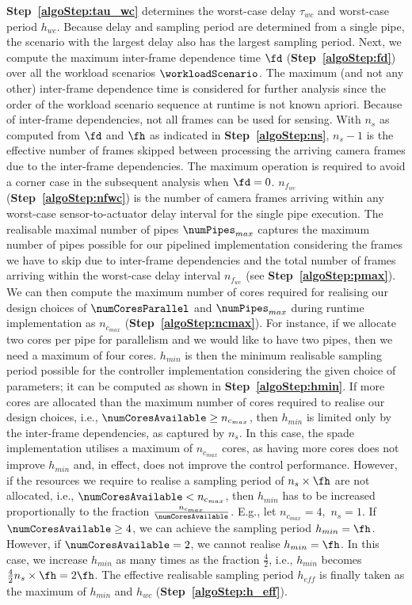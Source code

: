 \textbf{Step~\ref{algoStep:tau_wc}} determines the worst-case delay $\tau_{wc}$ and worst-case period $h_{wc}$. 
Because delay and sampling period are determined from a single pipe, the scenario with the largest delay also has the largest sampling period.
Next, we compute the maximum inter-frame dependence time $\fd$ ({\bfseries Step~\ref{algoStep:fd}}) over all the workload scenarios $\workloadScenario$. 
The maximum (and not any other) inter-frame dependence time is considered for further analysis since the order of the workload scenario sequence at runtime is not known apriori. Because of inter-frame dependencies, not all frames can be used for sensing.
With $n_s$ as computed from $\fd$ and $\fh$ as indicated in \textbf{Step~\ref{algoStep:ns}}, $n_s-1$ is the effective number of frames skipped between processing the arriving camera frames due to the inter-frame dependencies. 
The maximum operation is required to avoid a corner case in the subsequent analysis when $\fd =0$. 
$n_{f_{wc}}$ ({\bfseries Step~\ref{algoStep:nfwc}}) is the number of camera frames arriving within any worst-case sensor-to-actuator delay interval for the single pipe execution.
The realisable maximal number of pipes $\numPipes_{max}$ captures the maximum number of pipes possible for our pipelined implementation considering the frames we have to skip due to inter-frame dependencies and the total number of frames arriving within the worst-case delay interval $n_{f_{wc}}$ (see {\bfseries Step~\ref{algoStep:pmax}}).
We can then compute the maximum number of cores required for realising our design choices of $\numCoresParallel$ and $\numPipes_{max}$ during runtime implementation as $n_{c_{max}}$ ({\bfseries Step~\ref{algoStep:ncmax}}). For instance, if we allocate two cores per pipe for parallelism and we would like to have two pipes, then we need a maximum of four cores.
$h_{min}$ is then the minimum realisable sampling period possible for the controller implementation considering the given choice of parameters; it can be computed as shown in {\bfseries Step~\ref{algoStep:hmin}}.
If more cores are allocated than the maximum number of cores required to realise our design choices, i.e., $\numCoresAvailable\ge n_{c_{max}}$, then $h_{min}$ is limited only by the inter-frame dependencies, as captured by $n_s$.
In this case, the \gls{spade} implementation utilises a maximum of $n_{c_{max}}$ cores, as having more cores does not improve $h_{min}$ and, in effect, does not improve the control performance. 
However, if the resources we require to realise a sampling period of $n_s\times \fh$ are not allocated, i.e., $\numCoresAvailable < n_{c_{max}}$, then $h_{min}$ has to be increased proportionally to the fraction $\frac{n_{c_{max}}}{\numCoresAvailable}$.
E.g., let $n_{c_{max}}=4$,\ $n_s=1$. If $\numCoresAvailable\ge 4$, we can achieve the sampling period $h_{min}=\fh$. However, if $\numCoresAvailable=2$, we cannot realise $h_{min}=\fh$. In this case, we increase $h_{min}$ as many times as the fraction $\frac{4}{2}$, i.e., $h_{min}$ becomes $\frac{4}{2}n_s\times \fh=2\fh$.
The effective realisable sampling period $h_{\mathit{eff}}$ is finally taken as the maximum of $h_{min}$ and $h_{wc}$ ({\bfseries Step~\ref{algoStep:h_eff}}). 

